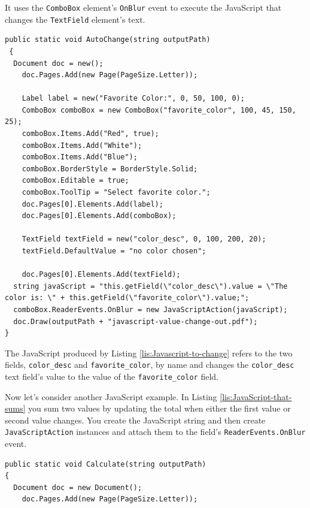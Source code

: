 \documentclass[american,letterpaper]{tufte-book}
\numberwithin{equation}{section}
\numberwithin{figure}{section}
\begin{document}
{{\begin{marginfigure}
\end{marginfigure}
 It uses the \texttt{ComboBox} element's \texttt{OnBlur} event to
execute the JavaScript that changes the \texttt{TextField} element's
text.

\bgroup{}
\begin{lstlisting}[caption={Javascript to change a field value.},label={lis:Javascript-to-change},basicstyle={\small\ttfamily},breaklines=true]
public static void AutoChange(string outputPath)
 {
  Document doc = new();
    doc.Pages.Add(new Page(PageSize.Letter));

    Label label = new("Favorite Color:", 0, 50, 100, 0);
    ComboBox comboBox = new ComboBox("favorite_color", 100, 45, 150, 25);
    comboBox.Items.Add("Red", true);
    comboBox.Items.Add("White");
    comboBox.Items.Add("Blue");
    comboBox.BorderStyle = BorderStyle.Solid;
    comboBox.Editable = true;
    comboBox.ToolTip = "Select favorite color.";
    doc.Pages[0].Elements.Add(label);
    doc.Pages[0].Elements.Add(comboBox);

    TextField textField = new("color_desc", 0, 100, 200, 20);
    textField.DefaultValue = "no color chosen";

    doc.Pages[0].Elements.Add(textField);
  string javaScript = "this.getField(\"color_desc\").value = \"The color is: \" + this.getField(\"favorite_color\").value;";
  comboBox.ReaderEvents.OnBlur = new JavaScriptAction(javaScript);
  doc.Draw(outputPath + "javascript-value-change-out.pdf");
}
\end{lstlisting}
\leavevmode\egroup

The JavaScript produced by Listing \ref{lis:Javascript-to-change}
refers to the two fields, \texttt{color\_desc} and \texttt{favorite\_color},
by name and changes the \texttt{color\_desc} text field's value to
the value of the \texttt{favorite\_color} field. 

Now let's consider another JavaScript example. In Listing \ref{lis:JavaScript-that-sums}
you sum two values by updating the total when either the first value
or second value changes. You create the JavaScript string and then
create \texttt{JavaScriptAction} instances and attach them to the
field's \texttt{ReaderEvents.OnBlur} event. 

\bgroup{}
\begin{lstlisting}[caption={JavaScript that sums two values.},label={lis:JavaScript-that-sums},basicstyle={\small\ttfamily},breaklines=true]
public static void Calculate(string outputPath)
{
  Document doc = new Document();
    doc.Pages.Add(new Page(PageSize.Letter));


\end{lstlisting}}}
\end{document}
